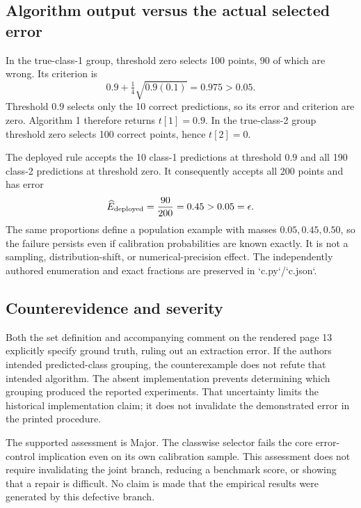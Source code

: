 \documentclass[10pt]{article}
\begin{document}
\subsection*{Algorithm output versus the actual selected error}
In the true-class-1 group, threshold zero selects 100 points, 90 of which are wrong. Its criterion is \[0.9+\tfrac14\sqrt{0.9(0.1)}=0.975>0.05.\] Threshold \(0.9\) selects only the 10 correct predictions, so its error and criterion are zero. Algorithm 1 therefore returns \(t[1]=0.9\). In the true-class-2 group threshold zero selects 100 correct points, hence \(t[2]=0\).\par
The deployed rule accepts the 10 class-1 predictions at threshold \(0.9\) and all 190 class-2 predictions at threshold zero. It consequently accepts all 200 points and has error \[\widehat E_{\rm deployed}=\frac{90}{200}
 =0.45>0.05=\epsilon .\] The same proportions define a population example with masses \(0.05,0.45,0.50\), so the failure persists even if calibration probabilities are known exactly. It is not a sampling, distribution-shift, or numerical-precision effect. The independently authored enumeration and exact fractions are preserved in `c.py`/`c.json`.\par
\subsection*{Counterevidence and severity}
Both the set definition and accompanying comment on the rendered page 13 explicitly specify ground truth, ruling out an extraction error. If the authors intended predicted-class grouping, the counterexample does not refute that intended algorithm. The absent implementation prevents determining which grouping produced the reported experiments. That uncertainty limits the historical implementation claim; it does not invalidate the demonstrated error in the printed procedure.\par
The supported assessment is Major. The classwise selector fails the core error-control implication even on its own calibration sample. This assessment does not require invalidating the joint branch, reducing a benchmark score, or showing that a repair is difficult. No claim is made that the empirical results were generated by this defective branch.\par
\end{document}
